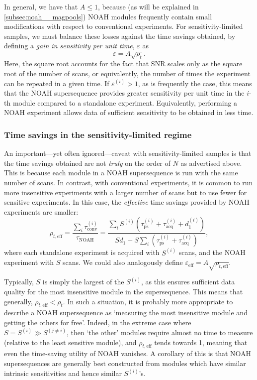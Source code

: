 In general, we have that $A \leq 1$, because (as will be explained in \cref{subsec:noah__magpools}) NOAH modules frequently contain small modifications with respect to conventional experiments.
For sensitivity-limited samples, we must balance these losses against the time savings obtained, by defining a \textit{gain in sensitivity per unit time}, $\varepsilon$ as
\begin{equation}
    \label{eq:varepsilon_i}
    \varepsilon = A \sqrt{\rho_t}.
\end{equation}
Here, the square root accounts for the fact that SNR scales only as the square root of the number of scans, or equivalently, the number of times the experiment can be repeated in a given time.
If $\varepsilon^{(i)} > 1$, as is frequently the case, this means that the NOAH supersequence provides greater sensitivity per unit time in the $i$-th module compared to a standalone experiment.
Equivalently, performing a NOAH experiment allows data of sufficient sensitivity to be obtained in less time.


\subsubsection{Time savings in the sensitivity-limited regime}

An important---yet often ignored---caveat with sensitivity-limited samples is that the time savings obtained are not \textit{truly} on the order of $N$ as advertised above.
This is because each module in a NOAH supersequence is run with the same number of scans.
In contrast, with conventional experiments, it is common to run more insensitive experiments with a larger number of scans but to use fewer for sensitive experiments.
In this case, the \textit{effective} time savings provided by NOAH experiments are smaller:
\begin{equation}
    \label{eq:rho_t_eff}
    \rho_{t,\text{eff}}
    = \frac{\sum_i \tau_\text{conv}^{(i)}}{\tau_\text{NOAH}}
    = \frac{{\sum_i S^{(i)}(\tau_\text{ps}^{(i)} + \tau_\text{acq}^{(i)} + d_1^{(i)})}}{Sd_1 + S\sum_i (\tau_\text{ps}^{(i)} + \tau_\text{acq}^{(i)})},
\end{equation}
where each standalone experiment is acquired with $S^{(i)}$ scans, and the NOAH experiment with $S$ scans.
We could also analogously define $\varepsilon_\text{eff} = A\sqrt{\rho_{t,\text{eff}}}$.

Typically, $S$ is simply the largest of the $S^{(i)}$, as this ensures sufficient data quality for the most insensitive module in the supersequence.
This means that generally, $\rho_{t,\text{eff}} < \rho_t$.
In such a situation, it is probably more appropriate to describe a NOAH supersequence as `measuring the most insensitive module and getting the others for free'.
Indeed, in the extreme case where $S = S^{(i)} \gg S^{(j\neq i)}$, then `the other' modules require almost no time to measure (relative to the least sensitive module), and $\rho_{t,\text{eff}}$ tends towards 1, meaning that even the time-saving utility of NOAH vanishes.
A corollary of this is that NOAH supersequences are generally best constructed from modules which have similar intrinsic sensitivities and hence similar $S^{(i)}$'s.

